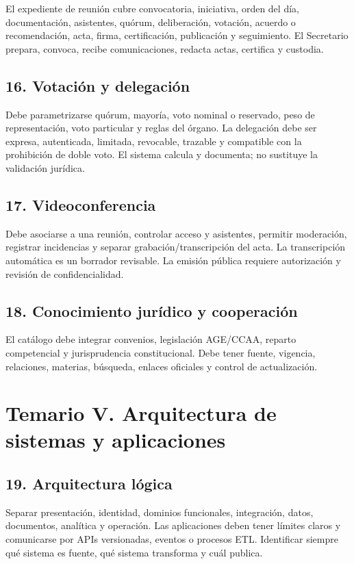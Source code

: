 \documentclass[11pt,a4paper]{article}
\begin{document}
El expediente de reunión cubre convocatoria, iniciativa, orden del día, documentación, asistentes, quórum, deliberación, votación, acuerdo o recomendación, acta, firma, certificación, publicación y seguimiento. El Secretario prepara, convoca, recibe comunicaciones, redacta actas, certifica y custodia.

\subsection{16. Votación y delegación}

Debe parametrizarse quórum, mayoría, voto nominal o reservado, peso de representación, voto particular y reglas del órgano. La delegación debe ser expresa, autenticada, limitada, revocable, trazable y compatible con la prohibición de doble voto. El sistema calcula y documenta; no sustituye la validación jurídica.

\subsection{17. Videoconferencia}

Debe asociarse a una reunión, controlar acceso y asistentes, permitir moderación, registrar incidencias y separar grabación/transcripción del acta. La transcripción automática es un borrador revisable. La emisión pública requiere autorización y revisión de confidencialidad.

\subsection{18. Conocimiento jurídico y cooperación}

El catálogo debe integrar convenios, legislación AGE/CCAA, reparto competencial y jurisprudencia constitucional. Debe tener fuente, vigencia, relaciones, materias, búsqueda, enlaces oficiales y control de actualización.

\section{Temario V. Arquitectura de sistemas y aplicaciones}

\subsection{19. Arquitectura lógica}

Separar presentación, identidad, dominios funcionales, integración, datos, documentos, analítica y operación. Las aplicaciones deben tener límites claros y comunicarse por APIs versionadas, eventos o procesos ETL. Identificar siempre qué sistema es fuente, qué sistema transforma y cuál publica.
\end{document}
